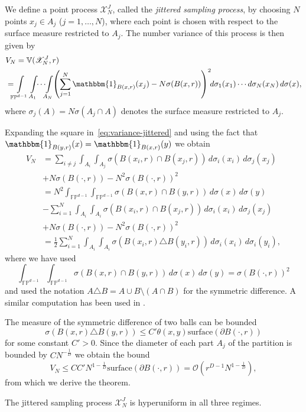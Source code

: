 We define a point process $\mathscr{X}_N^J$, called the \emph{jittered sampling
  process}, by choosing $N$ points $x_j\in A_j$ ($j=1,\ldots,N$), where each
point is chosen with respect to the surface measure restricted to $A_j$. The
number variance of this process is then given by
\begin{equation}\label{eq:variance-jittered}
  \begin{split}
    &V_N=\mathbb{V}(\mathscr{X}_N^J,r)\\
    &=\!\!\! \int\limits_{\mathbb{FP}^{d-1}}\int\limits_{A_1}\!\!\cdots\!\!\int\limits_{A_N}
    \!\!\left(\sum_{j=1}^N\mathbbm{1}_{B(x,r)}(x_j)-N\sigma(B(x,r))\right)^2\!\!
    d\sigma_1(x_1)\cdots d\sigma_N(x_N)\,d\sigma(x),
  \end{split}
\end{equation}
where $\sigma_j(A)=N\sigma(A_j\cap A)$ denotes the surface measure restricted
to $A_j$.

Expanding the square in~\eqref{eq:variance-jittered} and using the fact that
$\mathbbm{1}_{B(y,r)}(x)=\mathbbm{1}_{B(x,r)}(y)$ we obtain
\begin{align*}
  V_N&=\sum_{i\neq j}\int_{A_i}\int_{A_j}
  \sigma(B(x_i,r)\cap B(x_j,r))\,d\sigma_i(x_i)\,
  d\sigma_j(x_j)\\
  &+N\sigma(B(\cdot,r))-N^2\sigma(B(\cdot,r))^2 \\
  &=N^2\int_{\mathbb{FP}^{d-1}}\int_{\mathbb{FP}^{d-1}}
  \sigma(B(x,r)\cap B(y,r))\,d\sigma(x)\,
  d\sigma(y)\\
  &-
  \sum_{i=1}^N\int_{A_i}\int_{A_i}\sigma(B(x_i,r)\cap B(x_j,r))\,d\sigma_i(x_i)\,
  d\sigma_j(x_j)\\
  &+N\sigma(B(\cdot,r))-N^2\sigma(B(\cdot,r))^2\\
  &=\frac12\sum_{i=1}^N\int_{A_i}\int_{A_i}\sigma(B(x_i,r)\triangle B(y_i,r))
  \,d\sigma_i(x_i)\,d\sigma_i(y_i),
\end{align*}
where we have used
\begin{equation*}
  \int_{\mathbb{FP}^{d-1}}\int_{\mathbb{FP}^{d-1}}
  \sigma(B(x,r)\cap B(y,r))\,d\sigma(x)\,
  d\sigma(y)=\sigma(B(\cdot,r))^2
\end{equation*}
and used the notation $A\triangle B=A\cup B\setminus(A\cap B)$ for the
symmetric difference. A similar computation has been used in
\cite{Brauchart_Grabner_Kusner+2020:hyperuniform_point_sets}.

The measure of the symmetric difference of two balls can be bounded
\begin{equation}\label{eq:symmetric}
  \sigma(B(x,r)\triangle B(y,r))\leq
  C'\theta(x,y)\mathrm{surface}(\partial B(\cdot,r))
\end{equation}
for some constant $C'>0$. Since the diameter of each part $A_j$ of the partition
is bounded by $CN^{-\frac1D}$ we obtain the bound
\begin{equation*}
  V_N\leq CC'N^{1-\frac1D}\mathrm{surface}(\partial B(\cdot,r))=
  \mathcal{O}(r^{D-1}N^{1-\frac1D}),
\end{equation*}
from which we derive the theorem.
\begin{theorem}
  The jittered sampling process $\mathscr{X}_N^J$ is hyperuniform in all
three regimes.
\end{theorem}
